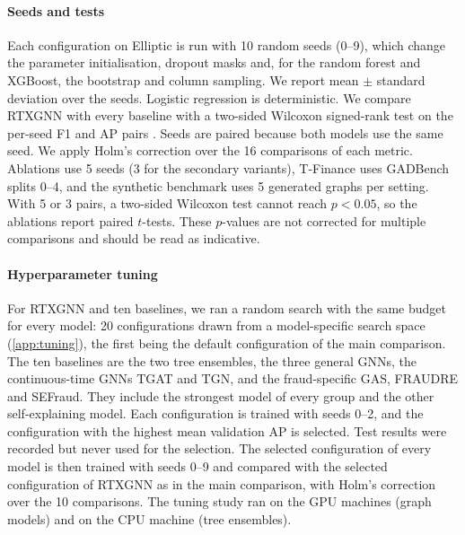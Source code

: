 \paragraph{Seeds and tests} Each configuration on Elliptic is run with 10 random seeds (0--9), which change the parameter initialisation, dropout masks and, for the random forest and XGBoost, the bootstrap and column sampling. We report mean $\pm$ standard deviation over the seeds. Logistic regression is deterministic. We compare RTXGNN with every baseline with a two-sided Wilcoxon signed-rank test on the per-seed F1 and AP pairs \citep{demsar2006statistical}. Seeds are paired because both models use the same seed. We apply Holm's correction \citep{holm1979simple} over the 16 comparisons of each metric. Ablations use 5 seeds (3 for the secondary variants), T-Finance uses GADBench splits 0--4, and the synthetic benchmark uses 5 generated graphs per setting. With 5 or 3 pairs, a two-sided Wilcoxon test cannot reach $p<0.05$, so the ablations report paired $t$-tests. These $p$-values are not corrected for multiple comparisons and should be read as indicative.

\paragraph{Hyperparameter tuning} For RTXGNN and ten baselines, we ran a random search with the same budget for every model: 20 configurations drawn from a model-specific search space (\mbox{\ref{app:tuning}}), the first being the default configuration of the main comparison. The ten baselines are the two tree ensembles, the three general GNNs, the continuous-time GNNs TGAT and TGN, and the fraud-specific GAS, FRAUDRE and SEFraud. They include the strongest model of every group and the other self-explaining model. Each configuration is trained with seeds 0--2, and the configuration with the highest mean validation AP is selected. Test results were recorded but never used for the selection. The selected configuration of every model is then trained with seeds 0--9 and compared with the selected configuration of RTXGNN as in the main comparison, with Holm's correction over the 10 comparisons. The tuning study ran on the GPU machines (graph models) and on the CPU machine (tree ensembles).

